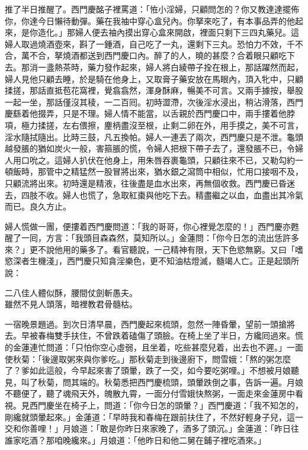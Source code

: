 推了半日推醒了。西門慶酩子裡罵道：「恠小淫婦，只顧問怎的？你又教達達擺佈你，你達今日懶待動彈。藥在我袖中穿心盒兒內。你拏來吃了，有本事品弄的他起來，是你造化。」那婦人便去袖內摸出穿心盒來開啟，裡面只剩下三四丸藥兒。這婦人取過燒酒壺來，斟了一鍾酒，自己吃了一丸，還剩下三丸。恐怕力不效，千不合，萬不合，拏燒酒都送到西門慶口內。{}醉了的人，曉的甚麼？合着眼只顧吃下去。那消一盞熱茶時，藥力發作起來，婦人將白綾帶子拴在根上，那話躍然而起，婦人見他只顧去睡，於是騎在他身上，又取膏子藥安放在馬眼內，頂入牝中，只顧揉搓，那話直抵苞花窩裡，覺翕翕然，渾身酥麻，暢美不可言。{}又兩手據按，舉股一起一坐，那話僅沒其稜，一二百囘。初時澀滯，次後淫水浸出，稍沾滑落，西門慶繇着他掇弄，只是不理。婦人情不能當，以舌親於西門慶口中，兩手摟着他脖項，極力揉搓，左右偎擦，麈柄盡沒至根，止剩二卵在外，用手摸之，美不可言，淫水隨拭隨出。比時三鼓，凡五換帕。婦人一連丟了兩次，西門慶只是不泄。龜頭越發脹的猶如炭火一般，害箍脹的慌，令婦人把根下帶子去了，還發脹不已，令婦人用口吮之。這婦人扒伏在他身上，用朱唇吞裹龜頭，只顧往來不已，又勒勾約一頓飯時，那管中之精猛然一股冒將出來，猶水銀之瀉筒中相似，忙用口接咽不及，只顧流將出來。初時還是精液，往後盡是血水出來，再無個收救。{}西門慶已昏迷去，四肢不收。婦人也慌了，急取紅棗與他吃下去。精盡繼之以血，血盡出其冷氣而已。{}{}良久方止。

婦人慌做一團，便摟着西門慶問道：「我的哥哥，你心裡覺怎麼的！」西門慶亦甦醒了一囘，方言：「我頭目森森然，莫知所以。」金蓮問：「你今日怎的流出恁許多來？」更不說他用的藥多了。看官聽說，一己精神有限，天下色慾無窮。又曰「嗜慾深者生機淺」，西門慶只知貪淫樂色，更不知油枯燈滅，髓竭人亡。正是起頭所說：

\begin{myquote} 
二八佳人體似酥，腰間仗劍斬愚夫。\\雖然不見人頭落，暗裡教君骨髓枯。{}
\end{myquote} 

一宿晚景題過。到次日清早晨，西門慶起來梳頭，忽然一陣昏暈，望前一頭搶將去。早被春梅雙手扶住，不曾跌着磕傷了頭臉。在椅上坐了半日，方纔囘過來。慌的金蓮連忙問道：「只怕你空心虛弱，且坐着，吃些甚麼兒着，出去也不遲。」一面使秋菊：「後邊取粥來與你爹吃。」那秋菊走到後邊廚下，問雪娥：「熬的粥怎麼了？爹如此這般，今早起來害了頭暈，跌了一交，如今要吃粥哩。」不想被月娘聽見，叫了秋菊，問其端的。秋菊悉把西門慶梳頭，頭暈跌倒之事，告訴一遍。月娘不聽便了，聽了魂飛天外，魄散九霄，一面分付雪娥快熬粥，一面走來金蓮房中看視。{}見西門慶坐在椅子上，問道：「你今日怎的頭暈？」西門慶道：「我不知怎的，剛纔就頭暈起來。」金蓮道：「早時我和春梅在跟前扶住了，{}不然好輕身子兒，這一交和你善哩！」月娘道：「敢是你昨日來家晚了，酒多了頭沉。」金蓮道：「昨日往誰家吃酒？那咱晚纔來。」月娘道：「他昨日和他二舅在鋪子裡吃酒來。」

